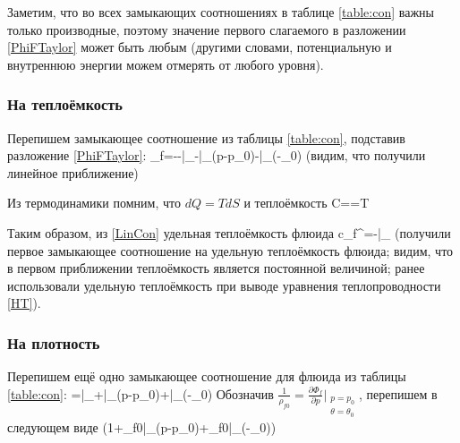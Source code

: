 \documentclass[main.tex]{subfiles}
\begin{document}
Заметим, что во всех замыкающих соотношениях в таблице \ref{table:con} важны только производные, поэтому значение первого слагаемого в разложении \eqref{PhiFTaylor} может быть любым (другими словами, потенциальную и внутреннюю энергии можем отмерять от любого уровня).

\subsubsection{На теплоёмкость}
Перепишем замыкающее соотношение из таблицы \ref{table:con}, подставив разложение \ref{PhiFTaylor}:
\beq\label{LinCon}
\eta_f=-\approx -\bigg|_{}-\bigg|_{}\left(p-p_0\right)-\bigg|_{}\left(\theta-\theta_0\right)
\eeq
(видим, что получили линейное приближение)

Из термодинамики помним, что $dQ=TdS$ и теплоёмкость
\beq
C==T
\eeq

Таким образом, из \eqref{LinCon} удельная теплоёмкость флюида
\beq\label{CF}
c_f^\theta=\theta{}\approx-\theta{}\bigg|_{}
\eeq
(получили первое замыкающее соотношение на удельную теплоёмкость флюида; видим, что в первом приближении теплоёмкость является постоянной величиной; ранее использовали удельную теплоёмкость при выводе уравнения теплопроводности \eqref{HT}).

\subsubsection{На плотность}
Перепишем ещё одно замыкающее соотношение для флюида из таблицы \ref{table:con}:
\beq
{}=\approx{}\bigg|_{}+\bigg|_{}\left(p-p_0\right)+\bigg|_{}\left(\theta-\theta_0\right)
\eeq
Обозначив $\displaystyle{}\frac{1}{\rho_{f0}}=\frac{\partial\Phi_f}{\partial p}\bigg|_{\substack{p=p_0\\ \theta=\theta_0}}$, перепишем в следующем виде
\beq\label{RhoF}
\approx{}\left(1+\rho_{f0}\bigg|_{}\left(p-p_0\right)+\rho_{f0}\bigg|_{}\left(\theta-\theta_0\right)\right)
\eeq
\end{document}
